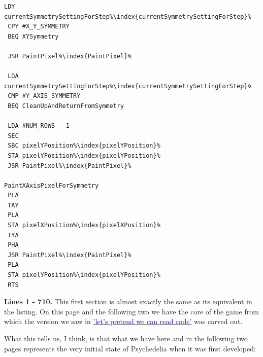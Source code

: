 \begin{minipage}[b]{0.33\linewidth}
\begin{lrbox}{\mybox}
\begin{lstlisting}[basicstyle=\ttfamily\tiny,escapechar=\%]
 LDY currentSymmetrySettingForStep%\index{currentSymmetrySettingForStep}%
 CPY #X_Y_SYMMETRY
 BEQ XYSymmetry

 JSR PaintPixel%\index{PaintPixel}%

 LDA currentSymmetrySettingForStep%\index{currentSymmetrySettingForStep}%
 CMP #Y_AXIS_SYMMETRY
 BEQ CleanUpAndReturnFromSymmetry

 LDA #NUM_ROWS - 1
 SEC
 SBC pixelYPosition%\index{pixelYPosition}%
 STA pixelYPosition%\index{pixelYPosition}%
 JSR PaintPixel%\index{PaintPixel}%

PaintXAxisPixelForSymmetry
 PLA
 TAY
 PLA
 STA pixelXPosition%\index{pixelXPosition}%
 TYA
 PHA
 JSR PaintPixel%\index{PaintPixel}%
 PLA
 STA pixelYPosition%\index{pixelYPosition}%
 RTS

\end{lstlisting}
\end{lrbox}%
\scalebox{0.8}{\usebox{\mybox}}
\end{minipage}
\clearpage
{}
\textbf{Lines 1 - 710.} This first section is almost exactly the same as its equivalent in the listing. On this
page and the following two we have the core of the game from which the version we saw in 
\hyperref[sec:commentary]{\textcolor{blue}{'let's pretend we can read code'}} was carved out.

What this tells us, I think, is that what we have here and in the following two pages represents the very initial state
of Psychedelia when it was first developed: 

